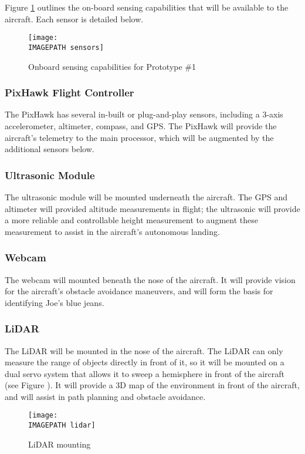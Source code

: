 Figure \ref{fig:sensing} outlines the on-board sensing capabilities that will be available to the aircraft. Each sensor is detailed below.

\begin{figure}[!h]
	\centering
	\texttt{[image: \\IMAGEPATH sensors]}
	\caption{Onboard sensing capabilities for Prototype \#1}
	\label{fig:sensing}
\end{figure}

\subsubsection*{PixHawk Flight Controller}
The PixHawk has several in-built or plug-and-play sensors, including a 3-axis accelerometer, altimeter, compass, and GPS. The PixHawk will provide the aircraft's telemetry to the main processor, which will be augmented by the additional sensors below.

\subsubsection*{Ultrasonic Module}
The ultrasonic module will be mounted underneath the aircraft. The GPS and altimeter will provided altitude measurements in flight; the ultrasonic will provide a more reliable and controllable height measurement to augment these measurement to assist in the aircraft's autonomous landing.

\subsubsection*{Webcam}
The webcam will mounted beneath the nose of the aircraft. It will provide vision for the aircraft's obstacle avoidance maneuvers, and will form the basis for identifying Joe's blue jeans.

\subsubsection*{LiDAR}
The LiDAR will be mounted in the nose of the aircraft. The LiDAR can only measure the range of objects directly in front of it, so it will be mounted on a dual servo system that allows it to sweep a hemisphere in front of the aircraft (see Figure ). It will provide a 3D map of the environment in front of the aircraft, and will assist in path planning and obstacle avoidance.

\begin{figure}[!h]
	\centering
	\texttt{[image: \\IMAGEPATH lidar]}
	\caption{LiDAR mounting}
	\label{fig:lidar}
\end{figure}